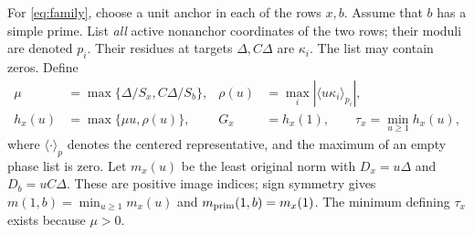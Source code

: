 \documentclass[11pt,a4paper]{article}
\theoremstyle{definition}\newtheorem{question}[theorem]{Question}
\theoremstyle{remark}\newtheorem{remark}[theorem]{Remark}
\begin{document}
For \eqref{eq:family}, choose a unit anchor in each of the rows $x,b$.
Assume that $b$ has a simple prime. List \emph{all} active nonanchor
coordinates of the two rows; their moduli are denoted $p_i$.
Their residues at targets $\Delta,C\Delta$ are $\kappa_i$.
The list may contain zeros. Define
\begin{align}
 \mu&=\max\{\Delta/S_x,C\Delta/S_b\},&
 \rho(u)&=\max_i|\langle u\kappa_i\rangle_{p_i}|,\nonumber\\
 h_x(u)&=\max\{\mu u,\rho(u)\},&
 G_x&=h_x(1),\qquad\tau_x=\min_{u\ge1}h_x(u),\label{eq:return}
\end{align}
where $\langle\cdot\rangle_p$ denotes the centered representative,
and the maximum of an empty phase list is zero.
Let $m_x(u)$ be the least original norm with $D_x=u\Delta$ and
$D_b=uC\Delta$. These are positive image indices; sign symmetry
gives $m(1,b)=\min_{u\ge1}m_x(u)$ and $m_{\mathrm{prim}}(1,b)=m_x(1)$.
The minimum defining $\tau_x$ exists because $\mu>0$.
\end{document}

